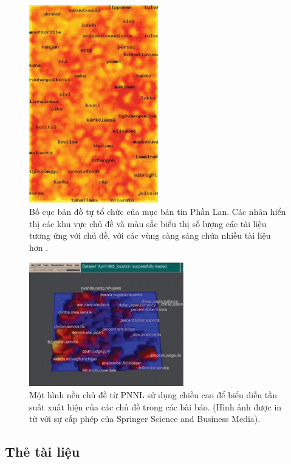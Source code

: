 \documentclass[14pt, a4paper]{article}
\numberwithin{equation}{section}
\numberwithin{figure}{section}
\numberwithin{dl}{section}
\numberwithin{md}{section}
\numberwithin{bd}{section}
\numberwithin{dn}{section}
\numberwithin{hq}{section}
\begin{document}
    \begin{figure}[h!]
        \centering
        \includegraphics[width=0.5\textwidth]{10.png}
        \caption{Bố cục bản đồ tự tổ chức của mục bản tin Phần Lan.
        Các nhãn hiển thị các khu vực chủ đề và màu sắc biểu thị số lượng các tài liệu tương ứng với chủ đề, với các vùng càng sáng chứa nhiều tài liệu hơn \cite{454}.}
        \label{fig:10}
    \end{figure}

    \begin{figure}[h!]
        \centering
        \includegraphics[width=0.6\textwidth]{11.png}
        \caption{Một hình nền chủ đề từ PNNL sử dụng chiều cao để biểu diễn tần suất xuất hiện của các chủ đề trong các bài báo. (Hình ảnh được in từ \cite{407} với sự cấp phép của  Springer Science and Business Media).}
        \label{fig:11}
    \end{figure}

    \subsection{Thẻ tài liệu}
\end{document}
